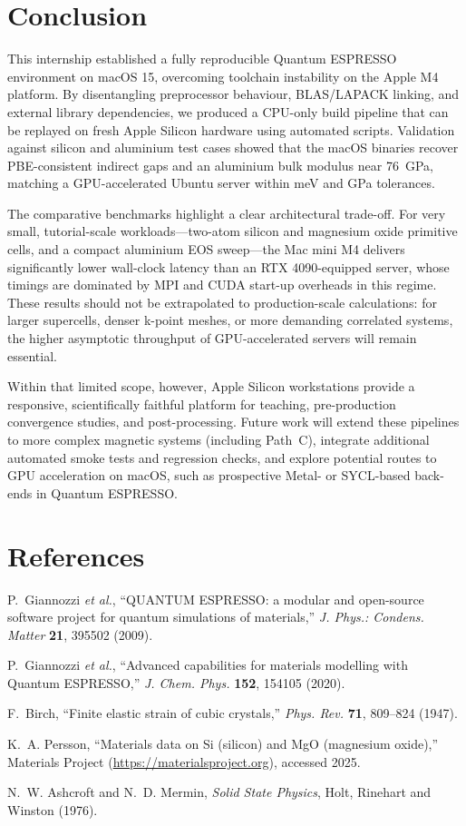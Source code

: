 \documentclass[12pt]{article}
\begin{document}
\section{Conclusion}
This internship established a fully reproducible Quantum ESPRESSO environment on macOS 15, overcoming toolchain instability on the Apple M4 platform. By disentangling preprocessor behaviour, BLAS/LAPACK linking, and external library dependencies, we produced a CPU-only build pipeline that can be replayed on fresh Apple Silicon hardware using automated scripts. Validation against silicon and aluminium test cases showed that the macOS binaries recover PBE-consistent indirect gaps and an aluminium bulk modulus near 76~GPa, matching a GPU-accelerated Ubuntu server within meV and GPa tolerances.

The comparative benchmarks highlight a clear architectural trade-off. For very small, tutorial-scale workloads---two-atom silicon and magnesium oxide primitive cells, and a compact aluminium EOS sweep—the Mac mini M4 delivers significantly lower wall-clock latency than an RTX 4090-equipped server, whose timings are dominated by MPI and CUDA start-up overheads in this regime. These results should not be extrapolated to production-scale calculations: for larger supercells, denser k-point meshes, or more demanding correlated systems, the higher asymptotic throughput of GPU-accelerated servers will remain essential.

Within that limited scope, however, Apple Silicon workstations provide a responsive, scientifically faithful platform for teaching, pre-production convergence studies, and post-processing. Future work will extend these pipelines to more complex magnetic systems (including Path~C), integrate additional automated smoke tests and regression checks, and explore potential routes to GPU acceleration on macOS, such as prospective Metal- or SYCL-based back-ends in Quantum ESPRESSO.

\section{References}
\begin{enumerate}[label={[}\arabic*{]}]
  \item P.~Giannozzi \textit{et al.}, ``QUANTUM ESPRESSO: a modular and open-source software project for quantum simulations of materials,'' \textit{J. Phys.: Condens. Matter} \textbf{21}, 395502 (2009).
  \item P.~Giannozzi \textit{et al.}, ``Advanced capabilities for materials modelling with Quantum ESPRESSO,'' \textit{J. Chem. Phys.} \textbf{152}, 154105 (2020).
  \item F.~Birch, ``Finite elastic strain of cubic crystals,'' \textit{Phys. Rev.} \textbf{71}, 809--824 (1947).
  \item K.~A. Persson, ``Materials data on Si (silicon) and MgO (magnesium oxide),'' Materials Project (\url{https://materialsproject.org}), accessed 2025.
  \item N.~W. Ashcroft and N.~D. Mermin, \textit{Solid State Physics}, Holt, Rinehart and Winston (1976).
\end{enumerate}
\end{document}
